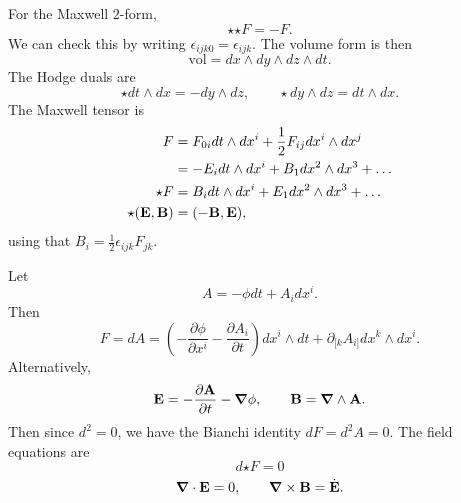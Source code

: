 \begin{example}[$n = 4, t = 1, p = 2$]
  For the Maxwell $2$-form, 
  \begin{equation}
    {\star {\star F}} = - F.
  \end{equation}
  We can check this by writing $\epsilon_{ijk0} = \epsilon_{ijk}$. The volume form is then 
  \begin{equation}
    \text{vol} = dx \wedge dy \wedge dz \wedge dt.
  \end{equation}
  The Hodge duals are
  \begin{equation}
    {\star dt \wedge dx} =  -dy \wedge dz, \qquad \star dy \wedge dz = dt \wedge dx.
  \end{equation}
  The Maxwell tensor is
  \begin{align}
    F &= F_{0i} dt \wedge dx^i + \frac{1}{2} F_{ij} dx^{i} \wedge dx^{j} \\
    &= -E_i dt \wedge dx^{i} + B_1 dx^2 \wedge dx^3 + \dots \\
    \star F &= B_i dt \wedge dx^{i} + E_1 dx^2 \wedge dx^3 + \dots \\
    \star (\vb{E}, \vb{B}) &= (-\vb{B}, \vb{E}), 
  \end{align}
  using that $B_i = \frac{1}{2} \epsilon_{ijk} F_{jk}$.

  Let 
  \begin{equation}
    A = - \phi dt + A_i dx^{i}.
  \end{equation}
  Then 
  \begin{equation}
    F = dA = \left( - \frac{\partial \phi}{\partial x^{i}} - \frac{\partial A_{i}}{\partial t} \right) dx^{i} \wedge dt + \partial_{[k} A_{i]} dx^{k} \wedge dx^{i}.
  \end{equation}
  Alternatively,
  \begin{equation}
    \vb{E} = - \frac{\partial \vb{A}}{\partial t} - \boldsymbol \nabla \phi, \qquad \vb{B} = \boldsymbol \nabla \wedge \vb{A}.
  \end{equation}
  Then since $d^2 = 0$, we have the Bianchi identity $dF = d^2 A = 0$.
  The field equations are
  \begin{equation}
    d {\star F} = 0
  \end{equation}
  \begin{equation}
    \boldsymbol \nabla \cdot \vb{E} = 0, \qquad \boldsymbol \nabla \times \vb{B} = \dot{\vb{E}}.
  \end{equation}
\end{example}

